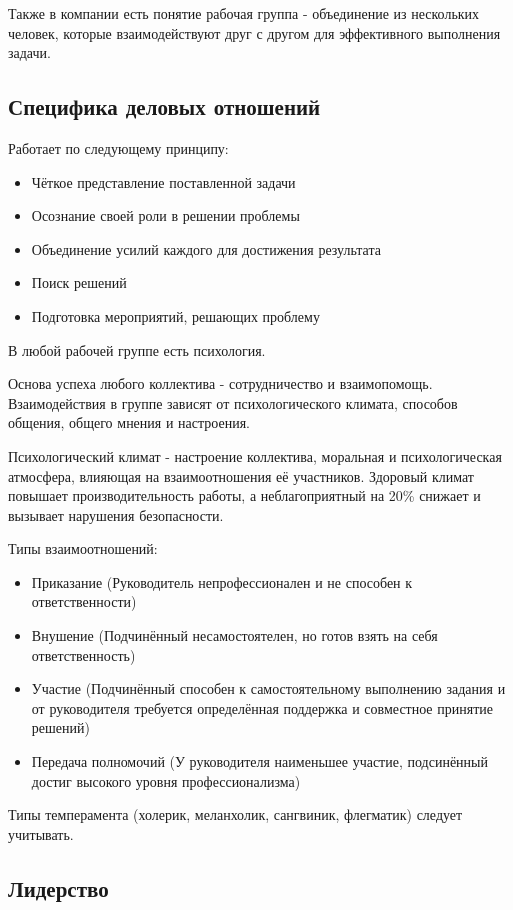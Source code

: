 Также в компании есть понятие рабочая группа - объединение из нескольких человек, которые взаимодействуют друг с другом для эффективного выполнения задачи.

\subsection{Специфика деловых отношений}

Работает по следующему принципу:
\begin{itemize}
    \item Чёткое представление поставленной задачи
    \item Осознание своей роли в решении проблемы
    \item Объединение усилий каждого для достижения результата
    \item Поиск решений
    \item Подготовка мероприятий, решающих проблему
\end{itemize}

В любой рабочей группе есть психология.

Основа успеха любого коллектива - сотрудничество и взаимопомощь.
Взаимодействия в группе зависят от психологического климата, способов общения, общего мнения и настроения.

Психологический климат - настроение коллектива, моральная и психологическая атмосфера, влияющая на взаимоотношения её участников. Здоровый климат повышает производительность работы, а неблагоприятный на 20\% снижает и вызывает нарушения безопасности.

Типы взаимоотношений:
\begin{itemize}
    \item Приказание (Руководитель непрофессионален и не способен к ответственности)
    \item Внушение (Подчинённый несамостоятелен, но готов взять на себя ответственность)
    \item Участие (Подчинённый способен к самостоятельному выполнению задания и от руководителя требуется определённая поддержка и совместное принятие решений)
    \item Передача полномочий (У руководителя наименьшее участие, подсинённый достиг высокого уровня профессионализма)
\end{itemize}

Типы темперамента (холерик, меланхолик, сангвиник, флегматик) следует учитывать.

\subsection{Лидерство}

